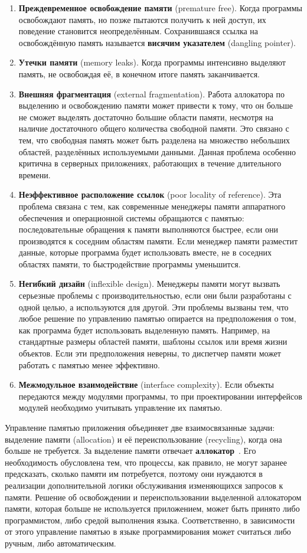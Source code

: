 \begin{enumerate}[label*=\arabic*.]
	\item \textbf{Преждевременное освобождение памяти} (premature free). 
	Когда программы освобождают память, но позже пытаются получить к ней доступ, их поведение становится неопределённым. Сохранившаяся ссылка на освобождённую память называется \textbf{висячим указателем} (dangling pointer).
	\item \textbf{Утечки памяти} (memory leaks). Когда программы интенсивно выделяют память, не освобождая её, в конечном итоге память заканчивается.
	\item \textbf{Внешняя фрагментация} (external fragmentation). Работа аллокатора по выделению и освобождению памяти может привести к тому, что он больше не сможет выделять достаточно большие области памяти, несмотря на наличие достаточного общего количества свободной памяти. Это связано с тем, что свободная память может быть разделена на множество небольших областей, разделённых используемыми данными. Данная проблема особенно критична в серверных приложениях, работающих в течение длительного времени.
	\item \textbf{Неэффективное расположение ссылок} (poor locality of reference). Эта проблема связана с тем, как современные менеджеры памяти аппаратного обеспечения и операционной системы обращаются с памятью: последовательные обращения к памяти выполняются быстрее, если они производятся к соседним областям памяти. Если менеджер памяти разместит данные, которые программа будет использовать вместе, не в соседних областях памяти, то быстродействие программы уменьшится.
	\item \textbf{Негибкий дизайн} (inflexible design). Менеджеры памяти могут вызвать серьезные проблемы с производительностью, если они были разработаны с одной целью, а используются для другой. Эти проблемы вызваны тем, что любое решение по управлению памятью опирается на предположения о том, как программа будет использовать выделенную память. Например, на стандартные размеры областей памяти, шаблоны ссылок или время жизни объектов. Если эти предположения неверны, то диспетчер памяти может работать с памятью менее эффективно.
	\item \textbf{Межмодульное взаимодействие} (interface complexity). Если объекты передаются между модулями программы, то при проектировании интерфейсов модулей необходимо учитывать управление их памятью.
\end{enumerate}

Управление памятью приложения объединяет две взаимосвязанные задачи: выделение памяти (allocation) и её переиспользование (recycling), когда она больше не требуется. За выделение памяти отвечает \textbf{аллокатор}~\cite{allocator}. Его необходимость обусловлена тем, что процессы, как правило, не могут заранее предсказать, сколько памяти им потребуется, поэтому они нуждаются в реализации дополнительной логики обслуживания изменяющихся запросов к памяти. Решение об освобождении и переиспользовании выделенной аллокатором памяти, которая больше не используется приложением, может быть принято либо программистом, либо средой выполнения языка. Соответственно, в зависимости от этого управление памятью в языке программирования может считаться либо ручным, либо автоматическим.

